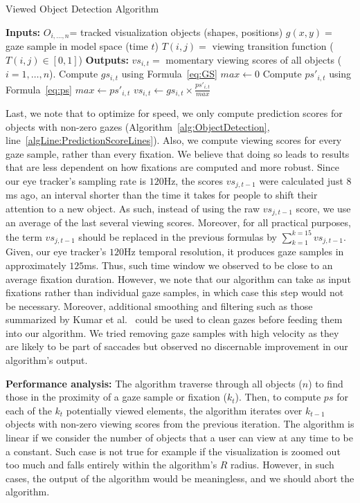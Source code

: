 \begin{algorithm}
\caption{Viewed Object Detection Algorithm}
\label{alg:ObjectDetection}
\begin{algorithmic}[1]
\State \textbf{Inputs: } 
\Statex $O_{i, \ldots, n}$= tracked visualization objects (shapes, positions)
\Statex $g(x,y) = $ gaze sample in model space (time $t$)
\Statex $T(i,j) = $ viewing transition function ($T(i,j) \in [0,1]$)
\State \textbf{Outputs:}
\Statex $vs_{i,t} = $ momentary viewing scores of all objects ($i = 1, \ldots, n$). 
	\State Compute $gs_{i,t}$	using Formula~\ref{eq:GS}
\EndFor
\State $max \gets 0$
	 \label{algLine:PredictionScoreLines}
		\State Compute $ps'_{i,t}$	using Formula~\ref{eq:ps}
			\State $max \gets ps'_{i,t}$
		\EndIf
	\EndIf
\EndFor
{}
	\State $vs_{i,t} \gets gs_{i,t} \times \frac{ps'_{i,t}}{max} $
\EndFor
\end{algorithmic}
\end{algorithm}

Last, we note that to optimize for speed, we only compute prediction scores for objects with non-zero gazes (Algorithm~\ref{alg:ObjectDetection}, line~\ref{algLine:PredictionScoreLines}). Also, we compute viewing scores for every gaze sample, rather than every fixation. We believe that doing so leads to results that are less dependent on how fixations are computed and more robust. Since our eye tracker's sampling rate is $120$Hz, the scores $vs_{j, t-1}$ were calculated just $8$ms ago, an interval shorter than the time it takes for people to shift their attention to a new object. As such, instead of using the raw $vs_{j,t-1}$ score, we use an average of the last several viewing scores. Moreover, for all practical purposes, the term $vs_{j,t-1}$ should be replaced in the previous formulas by $ \sum_{k=1}^{k=15}{vs_{j,t-1}}$. Given, our eye tracker's $120$Hz temporal resolution, it produces gaze samples in approximately $125$ms. Thus, such time window we observed to be close to an average fixation duration. However, we note that our algorithm can take as input fixations rather than individual gaze samples, in which case this step would not be necessary. Moreover, additional smoothing and filtering such as those summarized by Kumar et al.~\cite{Kum08} could be used to clean gazes before feeding them into our algorithm. We tried removing gaze samples with high velocity as they are likely to be part of saccades but observed no discernable improvement in our algorithm's output. 


{\bf Performance analysis:} The algorithm traverse through all objects ($n$) to find those in the proximity of a gaze sample or fixation ($k_t$). Then, to compute $ps$ for each of the $k_t$ potentially viewed elements, the algorithm iterates over $k_{t-1}$ objects with non-zero viewing scores from the previous iteration. The algorithm is linear if we consider the number of objects that a user can view at any time to be a constant. Such case is not true for example if the visualization is zoomed out too much and falls entirely within the algorithm's $R$ radius. However, in such cases, the output of the algorithm would be meaningless, and we should abort the algorithm.